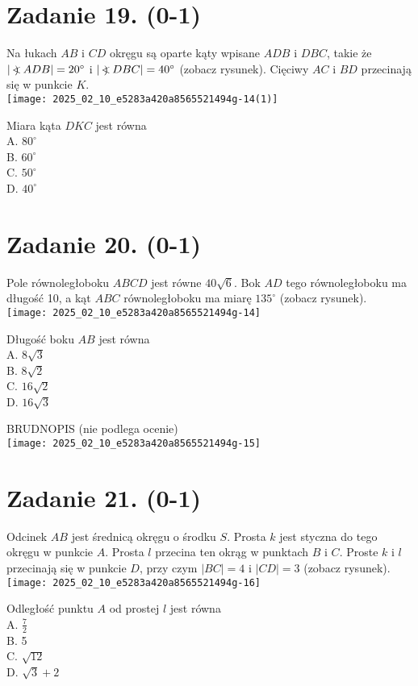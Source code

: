 \documentclass[10pt]{article}
\newcommand\Varangle{\mathop{{<\!\!\!\!\!\text{\small)}}\:}\nolimits}
\begin{document}
\section*{Zadanie 19. (0-1)}
Na łukach \(A B\) i \(C D\) okręgu są oparte kąty wpisane \(A D B\) i \(D B C\), takie że \(|\Varangle A D B|=20^{\circ}\) i \(|\Varangle D B C|=40^{\circ}\) (zobacz rysunek). Cięciwy \(A C\) i \(B D\) przecinają się w punkcie \(K\).\\
\texttt{[image: 2025\_02\_10\_e5283a420a8565521494g-14(1)]}

Miara kąta \(D K C\) jest równa\\
A. \(80^{\circ}\)\\
B. \(60^{\circ}\)\\
C. \(50^{\circ}\)\\
D. \(40^{\circ}\)

\section*{Zadanie 20. (0-1)}
Pole równoległoboku \(A B C D\) jest równe \(40 \sqrt{6}\). Bok \(A D\) tego równoległoboku ma długość 10, a kąt \(A B C\) równoległoboku ma miarę \(135^{\circ}\) (zobacz rysunek).\\
\texttt{[image: 2025\_02\_10\_e5283a420a8565521494g-14]}

Długość boku \(A B\) jest równa\\
A. \(8 \sqrt{3}\)\\
B. \(8 \sqrt{2}\)\\
C. \(16 \sqrt{2}\)\\
D. \(16 \sqrt{3}\)

BRUDNOPIS (nie podlega ocenie)\\
\texttt{[image: 2025\_02\_10\_e5283a420a8565521494g-15]}

\section*{Zadanie 21. (0-1)}
Odcinek \(A B\) jest średnicą okręgu o środku \(S\). Prosta \(k\) jest styczna do tego okręgu w punkcie \(A\). Prosta \(l\) przecina ten okrąg w punktach \(B\) i \(C\). Proste \(k\) i \(l\) przecinają się w punkcie \(D\), przy czym \(|B C|=4\) i \(|C D|=3\) (zobacz rysunek).\\
\texttt{[image: 2025\_02\_10\_e5283a420a8565521494g-16]}

Odległość punktu \(A\) od prostej \(l\) jest równa\\
A. \(\frac{7}{2}\)\\
B. 5\\
C. \(\sqrt{12}\)\\
D. \(\sqrt{3}+2\)
\end{document}
